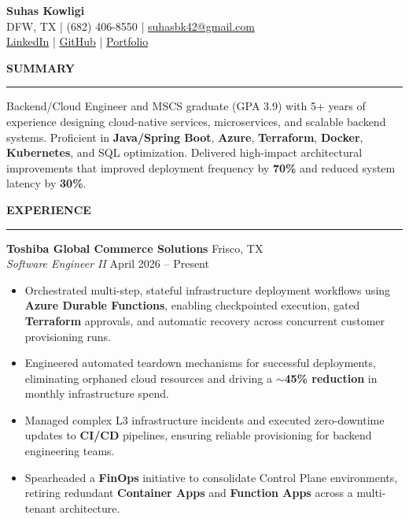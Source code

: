 \documentclass[10pt]{article}
\newcommand{\sectionTitle}[1]{\vspace{1pt}\noindent\textbf{\small #1}\vspace{0.5pt}\hrule\vspace{1pt}}
\begin{document}
\small

\begin{center}
    {\large \textbf{Suhas Kowligi}}\\
    DFW, TX \;|\; (682) 406-8550 \;|\; \href{mailto:suhasbk42@gmail.com}{suhasbk42@gmail.com}\\
    \href{https://www.linkedin.com/in/suhas-kowligi-b39a9415a}{LinkedIn} \;|\;
    \href{https://github.com/SuhasBk}{GitHub} \;|\;
    \href{https://suhasbk.github.io}{Portfolio}
\end{center}

\sectionTitle{SUMMARY}

Backend/Cloud Engineer and MSCS graduate (GPA 3.9) with 5+ years of experience designing cloud-native services, microservices, and scalable backend systems. Proficient in \textbf{Java/Spring Boot}, \textbf{Azure}, \textbf{Terraform}, \textbf{Docker}, \textbf{Kubernetes}, and SQL optimization. Delivered high-impact architectural improvements that improved deployment frequency by \textbf{70\%} and reduced system latency by \textbf{30\%}.

\sectionTitle{EXPERIENCE}

\textbf{Toshiba Global Commerce Solutions} \hfill Frisco, TX \\
\textit{Software Engineer II} \hfill April 2026 -- Present
\begin{itemize}
    \item Orchestrated multi-step, stateful infrastructure deployment workflows using \textbf{Azure Durable Functions}, enabling checkpointed execution, gated \textbf{Terraform} approvals, and automatic recovery across concurrent customer provisioning runs.
    \item Engineered automated teardown mechanisms for successful deployments, eliminating orphaned cloud resources and driving a \textbf{$\sim$45\% reduction} in monthly infrastructure spend.
    \item Managed complex L3 infrastructure incidents and executed zero-downtime updates to \textbf{CI/CD} pipelines, ensuring reliable provisioning for backend engineering teams.
    \item Spearheaded a \textbf{FinOps} initiative to consolidate Control Plane environments, retiring redundant \textbf{Container Apps} and \textbf{Function Apps} across a multi-tenant architecture.
\end{itemize}
\end{document}
